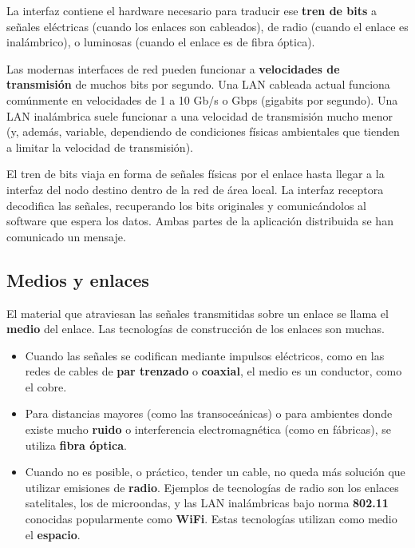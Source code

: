 \documentclass[spanish,A4,]{article}
\begin{document}
La interfaz contiene el hardware necesario para traducir ese
\textbf{tren de bits} a señales eléctricas (cuando los enlaces son
cableados), de radio (cuando el enlace es inalámbrico), o luminosas
(cuando el enlace es de fibra óptica).

Las modernas interfaces de red pueden funcionar a \textbf{velocidades de
transmisión} de muchos bits por segundo. Una LAN cableada actual
funciona comúnmente en velocidades de 1 a 10 Gb/s o Gbps (gigabits por
segundo). Una LAN inalámbrica suele funcionar a una velocidad de
transmisión mucho menor (y, además, variable, dependiendo de condiciones
físicas ambientales que tienden a limitar la velocidad de transmisión).

El tren de bits viaja en forma de señales físicas por el enlace hasta
llegar a la interfaz del nodo destino dentro de la red de área local. La
interfaz receptora decodifica las señales, recuperando los bits
originales y comunicándolos al software que espera los datos. Ambas
partes de la aplicación distribuida se han comunicado un mensaje.

\subsection{Medios y enlaces}\label{medios-y-enlaces}

El material que atraviesan las señales transmitidas sobre un enlace se
llama el \textbf{medio} del enlace. Las tecnologías de construcción de
los enlaces son muchas.

\begin{itemize}
\itemsep1pt\parskip0pt
\item
  Cuando las señales se codifican mediante impulsos eléctricos, como en
  las redes de cables de \textbf{par trenzado} o \textbf{coaxial}, el
  medio es un conductor, como el cobre.
\item
  Para distancias mayores (como las transoceánicas) o para ambientes
  donde existe mucho \textbf{ruido} o interferencia electromagnética
  (como en fábricas), se utiliza \textbf{fibra óptica}.
\item
  Cuando no es posible, o práctico, tender un cable, no queda más
  solución que utilizar emisiones de \textbf{radio}. Ejemplos de
  tecnologías de radio son los enlaces satelitales, los de microondas, y
  las LAN inalámbricas bajo norma \textbf{802.11} conocidas popularmente
  como \textbf{WiFi}. Estas tecnologías utilizan como medio el
  \textbf{espacio}.
\end{itemize}
\end{document}
